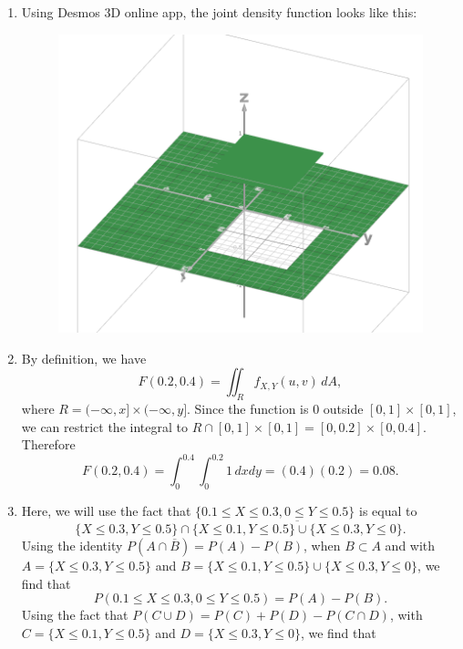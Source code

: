 \begin{sol*}
\begin{enumerate}[label=\alph*)]
\item Using Desmos 3D online app, the joint density function looks like this:
    \begin{figure}[ht]
    \centering 
    \includegraphics[scale=0.2]{JointDistributionChapE.png}
    \end{figure}
\item By definition, we have
    \[
        F(0.2, 0.4) = \iint_R f_{X, Y} (u, v) \, dA ,
    \]
where $R = (-\infty , x ] \times (-\infty , y]$. Since the function is $0$ outside $[0, 1] \times [0, 1]$, we can restrict the integral to $R \cap [0, 1] \times [0, 1] = [0, 0.2] \times [0, 0.4]$. Therefore
    \[
        F(0.2, 0.4) = \int_{0}^{0.4} \int_0^{0.2} 1 \, dx dy = (0.4) (0.2) = 0.08 .
    \]
\item Here, we will use the fact that $\{ 0.1 \leq X \leq 0.3, 0 \leq Y \leq 0.5 \}$ is equal to
    \[
        \{ X \leq 0.3 , Y \leq 0.5 \} \cap \overline{\{ X \leq 0.1 , Y \leq 0.5 \} \cup \{ X \leq 0.3 , Y \leq 0 \}}.
    \]
Using the identity $P (A \cap \overline{B}) = P (A) - P (B)$, when $B \subset A$ and with $A = \{ X \leq 0.3, Y \leq 0.5 \}$ and $B = \{ X \leq 0.1 , Y \leq 0.5\} \cup \{ X \leq 0.3 , Y \leq 0 \}$, we find that
    \[
        P (0.1 \leq X \leq 0.3 , 0 \leq Y \leq 0.5) = P (A) - P (B) .
    \]
Using the fact that $P (C \cup D) = P (C) + P (D) - P (C \cap D)$, with $C = \{ X \leq 0.1 , Y \leq 0.5 \}$ and $D = \{ X \leq 0.3 , Y \leq 0 \}$, we find that

\end{enumerate}
\end{sol*}
